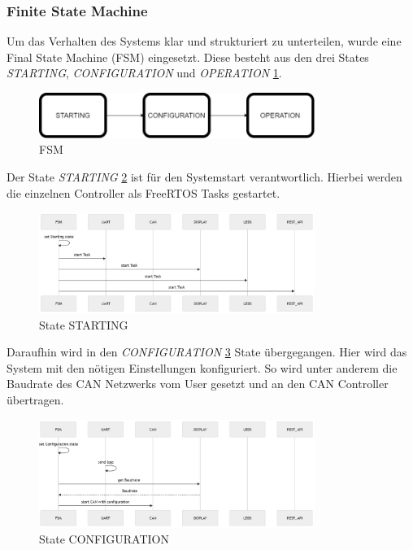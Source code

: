 \subsubsection{Finite State Machine}
\label{chap:fsm}
Um das Verhalten des Systems klar und strukturiert zu unterteilen, wurde eine Final State Machine (FSM) eingesetzt. Diese besteht aus den drei States \textit{STARTING}, \textit{CONFIGURATION} und \textit{OPERATION} \ref{fig:fsm}.
\begin{figure}
  \centering
  \includegraphics[width=0.8\textwidth]{img/fsm.drawio.png}
  \caption{FSM}
  \label{fig:fsm}
\end{figure}
Der State \textit{STARTING} \ref{fig:state_starting} ist für den Systemstart verantwortlich. Hierbei werden die einzelnen Controller als FreeRTOS Tasks gestartet.
\begin{figure}
  \centering
  \includegraphics[width=0.8\textwidth]{img/state_starting.PNG}
  \caption{State STARTING}
  \label{fig:state_starting}
\end{figure}
Daraufhin wird in den \textit{CONFIGURATION} \ref{fig:state_configuration} State übergegangen. Hier wird das System mit den nötigen Einstellungen konfiguriert. So wird unter anderem die Baudrate des CAN Netzwerks vom User gesetzt und an den CAN Controller übertragen.
\begin{figure}
  \centering
  \includegraphics[width=0.8\textwidth]{img/state_configuration.PNG}
  \caption{State CONFIGURATION}
  \label{fig:state_configuration}
\end{figure}
